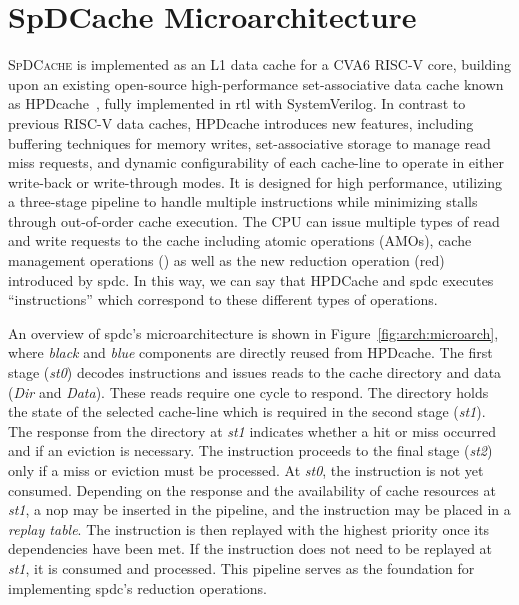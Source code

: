 
\section{SpDCache Microarchitecture}
\label{sec:arch:microarch}

\lettrine{S}{pDCache} is implemented as an L1 data cache for a CVA6 RISC-V core, building upon an existing open-source high-performance \gls{set}-associative data cache known as HPDcache~\cite{Fuguet2023_HPDcache}, fully implemented in \acrshort{rtl} with SystemVerilog.
In contrast to previous RISC-V data caches, HPDcache introduces new features, including buffering techniques for memory writes, \gls{set}-associative storage to manage read \gls{miss} requests, and dynamic configurability of each cache-line to operate in either write-back or write-through modes.
It is designed for high performance, utilizing a three-stage \gls{pipeline} to handle multiple instructions while minimizing stalls through out-of-order cache execution.
The CPU can issue multiple types of read and write requests to the cache including atomic operations (AMOs), cache management operations () as well as the new \gls{reduction} operation (\acrshort{red}) introduced by \acrlong{spdc}.
In this way, we can say that HPDCache and \acrlong{spdc} executes ``instructions'' which correspond to these different types of operations.

An overview of \acrlong{spdc}'s microarchitecture is shown in Figure~\ref{fig:arch:microarch}, where \textit{black} and \textit{blue} components are directly reused from HPDcache.
The first stage (\textit{st0}) decodes instructions and issues reads to the cache directory and data  (\textit{Dir} and \textit{Data}).
These reads require one cycle to respond.
The directory holds the state of the selected cache-line which is required in the second stage (\textit{st1}).
The response from the directory at \textit{st1} indicates whether a \gls{hit} or \gls{miss} occurred and if an \gls{eviction} is necessary.
The instruction proceeds to the final stage (\textit{st2}) only if a \gls{miss} or \gls{eviction} must be processed.
At \textit{st0}, the instruction is not yet consumed.
Depending on the response and the availability of cache resources at \textit{st1}, a \acrfull{nop} may be inserted in the \gls{pipeline}, and the instruction may be placed in a \textit{replay table}.
The instruction is then replayed with the highest priority once its dependencies have been met.
If the instruction does not need to be replayed at \textit{st1}, it is consumed and processed.
This \gls{pipeline} serves as the foundation for implementing \acrlong{spdc}'s \gls{reduction} operations.

